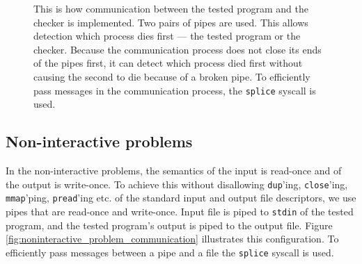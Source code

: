 \documentclass[en]{pracamgr}
\begin{document}
\begin{figure}[h]
\tikzset{>=latex} %
\centering
{}
\caption{This is how communication between the tested program and the checker is implemented. Two pairs of pipes are used. This allows detection which process dies first --- the tested program or the checker. Because the communication process does not close its ends of the pipes first, it can detect which process died first without causing the second to die because of a broken pipe. To efficiently pass messages in the communication process, the \texttt{splice} syscall is used.}
\label{fig:interactive_problem_real_communication}
\end{figure}

\subsection{Non-interactive problems}

In the non-interactive problems, the semantics of the input is read-once and of the output is write-once. To achieve this without disallowing \texttt{dup}'ing, \texttt{close}'ing, \texttt{mmap}'ping, \texttt{pread}'ing etc. of the standard input and output file descriptors, we use pipes that are read-once and write-once. Input file is piped to \texttt{stdin} of the tested program, and the tested program's output is piped to the output file. Figure \ref{fig:noninteractive_problem_communication} illustrates this configuration. To efficiently pass messages between a pipe and a file the \texttt{splice} syscall is used.
\end{document}
